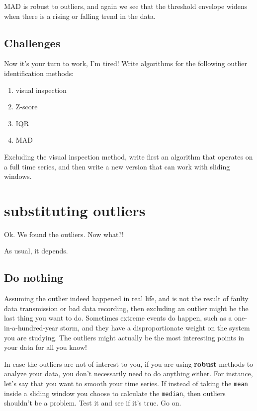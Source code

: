 \documentclass[
  letterpaper,
  DIV=11,
  numbers=noendperiod,
  oneside]{scrreprt}
\providecommand{\tightlist}{%
  \setlength{\itemsep}{0pt}\setlength{\parskip}{0pt}}\usepackage{longtable,booktabs,array}
\begin{document}
MAD is robust to outliers, and again we see that the threshold envelope
widens when there is a rising or falling trend in the data.

\hypertarget{challenges-1}{%
\section{Challenges}\label{challenges-1}}

Now it's your turn to work, I'm tired! Write algorithms for the
following outlier identification methods:

\begin{enumerate}
\def\labelenumi{\arabic{enumi}.}
\tightlist
\item
  visual inspection
\item
  Z-score
\item
  IQR
\item
  MAD
\end{enumerate}

Excluding the visual inspection method, write first an algorithm that
operates on a full time series, and then write a new version that can
work with sliding windows.

\hypertarget{substituting-outliers}{%
\chapter{substituting outliers}\label{substituting-outliers}}

Ok. We found the outliers. Now what?!

As usual, it depends.

\hypertarget{do-nothing}{%
\section{Do nothing}\label{do-nothing}}

Assuming the outlier indeed happened in real life, and is not the result
of faulty data transmission or bad data recording, then excluding an
outlier might be the last thing you want to do. Sometimes extreme events
do happen, such as a one-in-a-hundred-year storm, and they have a
disproportionate weight on the system you are studying. The outliers
might actually be the most interesting points in your data for all you
know!

In case the outliers are not of interest to you, if you are using
\textbf{robust} methods to analyze your data, you don't necessarily need
to do anything either. For instance, let's say that you want to smooth
your time series. If instead of taking the \texttt{mean} inside a
sliding window you choose to calculate the \texttt{median}, then
outliers shouldn't be a problem. Test it and see if it's true. Go on.
\end{document}
